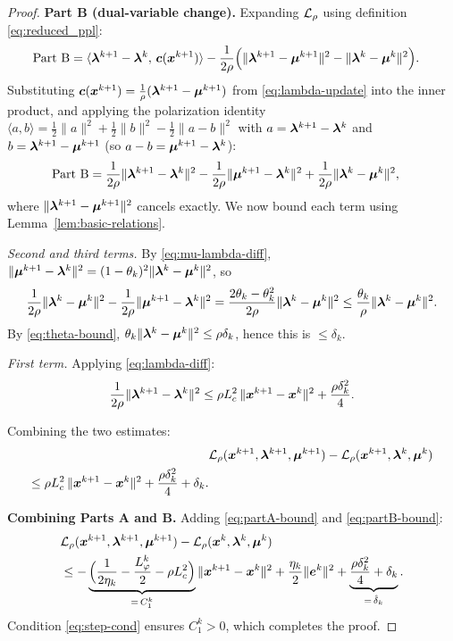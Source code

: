 \documentclass[10pt]{article}
\begin{document}
\begin{proof}
\medskip\noindent\textbf{Part B (dual-variable change).}
Expanding $\mathcal{L}_\rho$ using definition \eqref{eq:reduced_ppl}:
\begin{align}
  \text{Part B}
  &= \langle \bm{\lambda}^{k+1}-\bm{\lambda}^k,\, \bm{c}(\bm{x}^{k+1})\rangle
    - \frac{1}{2\rho}\Bigl(
        \|\bm{\lambda}^{k+1}-\bm{\mu}^{k+1}\|^2
      - \|\bm{\lambda}^k-\bm{\mu}^k\|^2
    \Bigr).
  \label{eq:partB-expand}
\end{align}
Substituting
$\bm{c}(\bm{x}^{k+1}) = \frac{1}{\rho}(\bm{\lambda}^{k+1}-\bm{\mu}^{k+1})$
from \eqref{eq:lambda-update} into the inner product, and applying
the polarization identity
$\langle a,b\rangle = \frac{1}{2}\|a\|^2+\frac{1}{2}\|b\|^2
-\frac{1}{2}\|a-b\|^2$
with $a = \bm{\lambda}^{k+1}-\bm{\lambda}^k$ and $b = \bm{\lambda}^{k+1}-\bm{\mu}^{k+1}$
(so $a - b = \bm{\mu}^{k+1}-\bm{\lambda}^k$):
\begin{align}
  \text{Part B}
  &= \frac{1}{2\rho}\|\bm{\lambda}^{k+1}-\bm{\lambda}^k\|^2
    - \frac{1}{2\rho}\|\bm{\mu}^{k+1}-\bm{\lambda}^k\|^2
    + \frac{1}{2\rho}\|\bm{\lambda}^k-\bm{\mu}^k\|^2,
  \label{eq:partB-identity}
\end{align}
where $\|\bm{\lambda}^{k+1}-\bm{\mu}^{k+1}\|^2$ cancels exactly.
We now bound each term using Lemma~\ref{lem:basic-relations}.

\medskip\noindent
\textit{Second and third terms.}
By \eqref{eq:mu-lambda-diff},
$\|\bm{\mu}^{k+1}-\bm{\lambda}^k\|^2 = (1-\theta_k)^2\|\bm{\lambda}^k-\bm{\mu}^k\|^2$,
so
\begin{equation}
  \frac{1}{2\rho}\|\bm{\lambda}^k-\bm{\mu}^k\|^2
  - \frac{1}{2\rho}\|\bm{\mu}^{k+1}-\bm{\lambda}^k\|^2
  = \frac{2\theta_k-\theta_k^2}{2\rho}\|\bm{\lambda}^k-\bm{\mu}^k\|^2
  \leq \frac{\theta_k}{\rho}\|\bm{\lambda}^k-\bm{\mu}^k\|^2.
\end{equation}
By \eqref{eq:theta-bound}, $\theta_k\|\bm{\lambda}^k-\bm{\mu}^k\|^2 \leq \rho\delta_k$,
hence this is $\leq \delta_k$.

\medskip\noindent
\textit{First term.}
Applying \eqref{eq:lambda-diff}:
\begin{equation}
  \frac{1}{2\rho}
  \|\bm{\lambda}^{k+1}-\bm{\lambda}^k\|^2
  \leq \rho L_c^2\,
  \|\bm{x}^{k+1}-\bm{x}^k\|^2
  + \frac{\rho\delta_k^2}{4}.
\end{equation}

\medskip\noindent
Combining the two estimates:
\begin{align}
  &\mathcal{L}_\rho(\bm{x}^{k+1},\bm{\lambda}^{k+1},\bm{\mu}^{k+1})
  - \mathcal{L}_\rho(\bm{x}^{k+1},\bm{\lambda}^k,\bm{\mu}^k) \notag\\
  \leq \rho L_c^2\,
       \|\bm{x}^{k+1}-\bm{x}^k\|^2
       + \frac{\rho\delta_k^2}{4} + \delta_k.
  \label{eq:partB-bound}
\end{align}

\medskip\noindent\textbf{Combining Parts A and B.}
Adding \eqref{eq:partA-bound} and \eqref{eq:partB-bound}:
\begin{align}
  &\mathcal{L}_\rho(\bm{x}^{k+1},\bm{\lambda}^{k+1},\bm{\mu}^{k+1})
   - \mathcal{L}_\rho(\bm{x}^k,\bm{\lambda}^k,\bm{\mu}^k) \notag\\
  &\leq -\underbrace{\Bigl(
      \frac{1}{2\eta_k} - \frac{L_\varphi^k}{2} - \rho L_c^2
    \Bigr)}_{=\,C_1^k}
    \|\bm{x}^{k+1}-\bm{x}^k\|^2
   + \frac{\eta_k}{2}\|\bm{e}^k\|^2
   + \underbrace{\frac{\rho\delta_k^2}{4} + \delta_k}_{=\,\hat\delta_k}.
\end{align}
Condition \eqref{eq:step-cond} ensures $C_1^k > 0$,
which completes the proof.
\end{proof}
\end{document}
